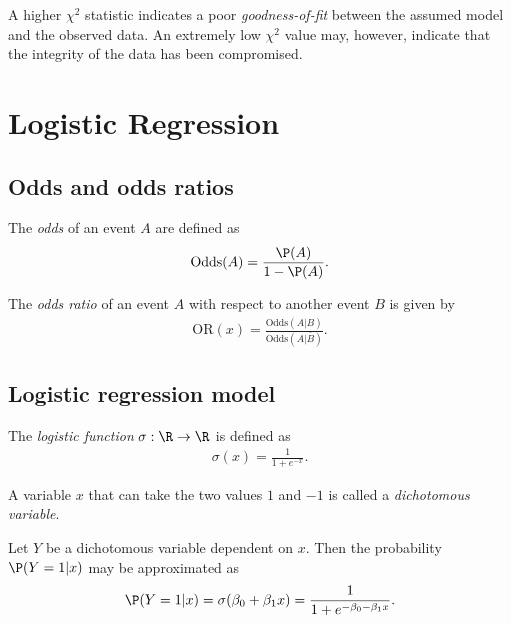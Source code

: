 \documentclass{article}
\begin{document}
\begin{theorem}
	A higher $\chi^2$ statistic indicates a poor \emph{goodness-of-fit}
	between the assumed model and the observed data. An extremely low
	$\chi^2$ value may, however, indicate that the integrity of the data
	has been compromised.
\end{theorem}


\section{Logistic Regression}


\subsection{Odds and odds ratios}

\begin{definition}
	The \emph{odds} of an event $A$ are defined as
	\begin{align*}
		\text{Odds}(A) = \frac{\P(A)}{1-\P(A)}.
	\end{align*}
\end{definition}

\begin{definition}
	The \emph{odds ratio} of an event $A$ with respect to another event
	$B$ is given by
	\begin{align*}
		\text{OR}(x) = \frac{\text{Odds}(A|B)}{\text{Odds}\left(A|\overline B\right)}.
	\end{align*}
\end{definition}

\subsection{Logistic regression model}

\begin{definition}
	The \emph{logistic function} $\sigma:\R\to\R$ is defined as
	\begin{align*}
		\sigma(x) = \frac{1}{1+e^{-x}}.
	\end{align*}
\end{definition}

\begin{definition}
	A variable $x$ that can take the two values $1$ and $-1$ is called a
	\emph{dichotomous variable}.
\end{definition}

\begin{theorem}
	Let $Y$ be a dichotomous variable dependent on $x$. Then the probability
	$\P(Y=1|x)$ may be approximated as
	\begin{align*}
		\P(Y=1|x)=\sigma(\beta_0+\beta_1 x) = \frac{1}{1+e^{-\beta_0-\beta_1 x}}.
	\end{align*}
\end{theorem}
\end{document}
